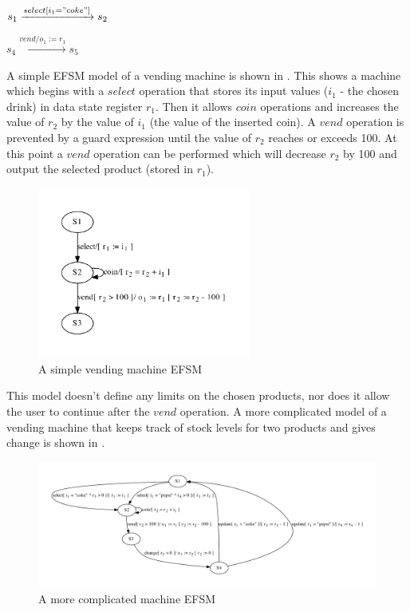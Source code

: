 \begin{center}
$s_1 \xrightarrow{select[i_{1}="coke"]} s_2$

$s_4 \xrightarrow{vend/o_{1} := r_{1}} s_5$
\end{center}

A simple EFSM model of a vending machine is shown in . This shows a machine which begins with a $select$ operation that stores its input values ($i_1$ - the chosen drink) in data state register $r_1$. Then it allows $coin$ operations and increases the value of $r_2$ by the value of $i_1$ (the value of the inserted coin). A $vend$ operation is prevented by a guard expression until the value of $r_2$ reaches or exceeds 100. At this point a $vend$ operation can be performed which will decrease $r_2$ by 100 and output the selected product (stored in $r_1$).

\begin{figure}[h]
\begin{center}
\includegraphics[width=7cm]{figures/efsm/vend-real.pdf}
\caption{A simple vending machine EFSM}
\label{fig:vendsimple}
\end{center}
\end{figure}

This model doesn't define any limits on the chosen products, nor does it allow the user to continue after the $vend$ operation. A more complicated model of a vending machine that keeps track of stock levels for two products and gives change is shown in .

\begin{figure}[h]
\begin{center}
\includegraphics[width=13cm]{figures/efsm/vend-complicated.pdf}
\caption{A more complicated machine EFSM}
\label{fig:vendcomplicated}
\end{center}
\end{figure}

